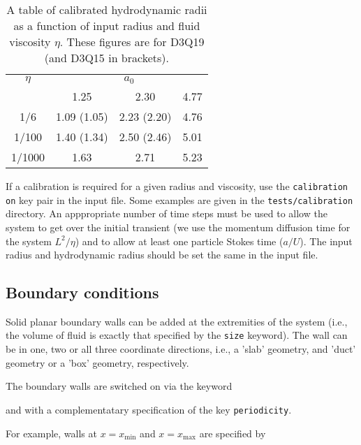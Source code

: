 \begin{table}[h]
\begin{center}
\begin{tabular}{|c|c|c|c|}
\hline
$\eta$ & \multicolumn{3}{c|}{$a_0$}\\ \cline{2-4} 
       & 1.25 & 2.30 & 4.77 \\
\hline
1/6  & 1.09 (1.05) & 2.23 (2.20) & 4.76 \\
1/100  & 1.40 (1.34) & 2.50 (2.46) & 5.01 \\
1/1000  & 1.63 & 2.71 & 5.23 \\
\hline
\end{tabular}
\end{center}
\caption{A table of calibrated hydrodynamic radii as a function of input
radius and fluid viscosity $\eta$. These figures are for D3Q19 (and D3Q15
in brackets).}
\end{table}

If a calibration is required for a given radius and viscosity,
use the \texttt{calibration on} key pair in the input file. Some
examples are given in the \texttt{tests/calibration} directory.
An apppropriate
number of time steps must be used to allow the system to get over
the initial transient (we use the momentum diffusion time for the
system $L^2/\eta$) and to allow at least one
particle Stokes time ($a/U$). The input radius and hydrodynamic
radius should be set the same in the input file.


\subsection{Boundary conditions}

Solid planar boundary walls can be added at the extremities of the
system (i.e., the volume of fluid is exactly that specified by
the \texttt{size} keyword). The wall can be in one, two or all three
coordinate directions, i.e., a 'slab' geometry, and 'duct' geometry
or a 'box' geometry, respectively.

The boundary walls are switched on via the keyword


and with a complementatary specification of the key \texttt{periodicity}.

For example, walls at $x = x_{\min}$  and $x = x_{\max}$  are specified
by



